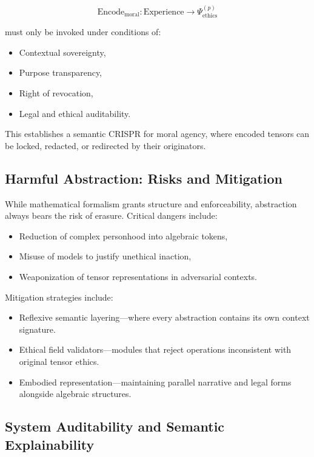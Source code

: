 \documentclass{article}
\theoremstyle{plain}
\theoremstyle{claimstyle}
\begin{document}
\[
\text{Encode}_{\text{moral}}: \text{Experience} \rightarrow \Psi^{(p)}_{\text{ethics}}
\]

must only be invoked under conditions of:

\begin{itemize}
    \item Contextual sovereignty,
    \item Purpose transparency,
    \item Right of revocation,
    \item Legal and ethical auditability.
\end{itemize}

This establishes a semantic CRISPR for moral agency, where encoded tensors can be locked, redacted, or redirected by their originators.

\subsection{Harmful Abstraction: Risks and Mitigation}

While mathematical formalism grants structure and enforceability, abstraction always bears the risk of erasure. Critical dangers include:

\begin{itemize}
    \item Reduction of complex personhood into algebraic tokens,
    \item Misuse of models to justify unethical inaction,
    \item Weaponization of tensor representations in adversarial contexts.
\end{itemize}

Mitigation strategies include:

\begin{itemize}
    \item Reflexive semantic layering—where every abstraction contains its own context signature.
    \item Ethical field validators—modules that reject operations inconsistent with original tensor ethics.
    \item Embodied representation—maintaining parallel narrative and legal forms alongside algebraic structures.
\end{itemize}

\subsection{System Auditability and Semantic Explainability}
\end{document}
